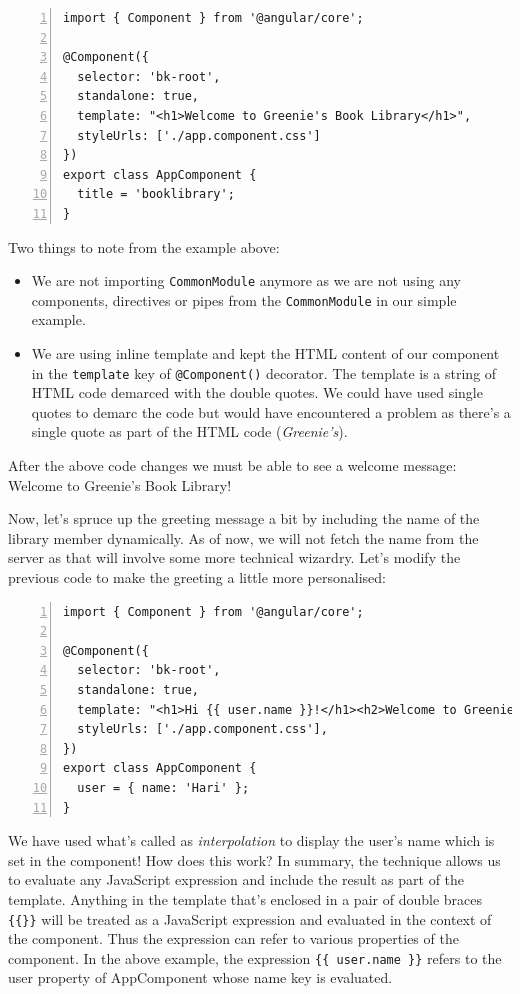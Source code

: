 \documentclass{report}
\begin{document}
\begin{Verbatim}[numbers=left]
import { Component } from '@angular/core';

@Component({
  selector: 'bk-root',
  standalone: true,
  template: "<h1>Welcome to Greenie's Book Library</h1>",
  styleUrls: ['./app.component.css']
})
export class AppComponent {
  title = 'booklibrary';
}
\end{Verbatim}

Two things to note from the example above:
\begin{itemize}
\item We are not importing \verb|CommonModule| anymore as we are not using any components, directives or pipes from the \verb|CommonModule| in our simple example.
\item We are using inline template and kept the HTML content of our component in the \verb|template| key of \verb|@Component()| decorator. The template is a string of HTML code demarced with the double quotes. We could have used single quotes to demarc the code but would have encountered a problem as there's a single quote as part of the HTML code (\textsl{Greenie's}).
\end{itemize}

After the above code changes we must be able to see a welcome message: Welcome to Greenie's Book Library!

Now, let's spruce up the greeting message a bit by including the name of the library member dynamically. As of now, we will not fetch the name from the server as that will involve some more technical wizardry. Let's modify the previous code to make the greeting a little more personalised:

\begin{Verbatim}[numbers=left]
import { Component } from '@angular/core';

@Component({
  selector: 'bk-root',
  standalone: true,
  template: "<h1>Hi {{ user.name }}!</h1><h2>Welcome to Greenie's Book Library</h2>",
  styleUrls: ['./app.component.css'],
})
export class AppComponent {
  user = { name: 'Hari' };
}
\end{Verbatim}

We have used what's called as \textsl{interpolation} to display the user's name which is set in the component! How does this work? In summary, the technique allows us to evaluate any JavaScript expression and include the result as part of the template. Anything in the template that's enclosed in a pair of double braces \verb|{{}}| will be treated as a JavaScript expression and evaluated in the context of the component. Thus the expression can refer to various properties of the component. In the above example, the expression \verb|{{ user.name }}| refers to the user property of AppComponent whose name key is evaluated.
\end{document}
